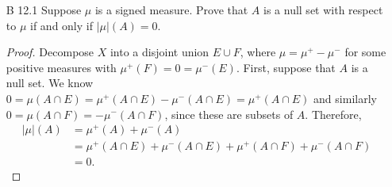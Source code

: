 \documentclass[10pt]{article}
\newcommand{\Q}{\mathbb{Q}}
\begin{document}
\begin{enumerate}
\begin{enumerate}
\begin{proof}
The forward inclusion is obvious, because $[0,\delta) \cap \Q \subset [0,\delta)$.  For the reverse inclusion, suppose that $x \in g_y^{-1}([0,\epsilon])$ for all $y \in [0,\delta) \cap \Q$.  For a given $y \in [0,\delta)$, take a sequence $y_n$ in $[0,\delta) \cap \Q$ converging to $y$.  By assumption, we have $g_{y_n}(x) \leq \epsilon$ for all $y_n$.  Since $g_y(x)$ is the absolute value of a difference of functions that are continuous in $y$, it is continuous in $y$ as well.  So taking limits gives $g_y(x) = \lim\limits_{n \rightarrow \infty} g_{y_n}(x) \leq \epsilon$, hence $x \in g_y^{-1}([0,\epsilon])$.  Because $y$ was arbitrary, the reverse inclusion is established.
\end{proof}

\item For any $\epsilon > 0$ there is a set $E \subset X$ such that $\mu(E) < \epsilon$ and $f(\cdot , y) \rightarrow f( \cdot , 0)$ uniformly on $E^c$ as $y \rightarrow 0$.

\begin{proof}
Since $f(x,y)$ is continuous in $y$ for all $x \in X$, we know $\lim\limits_{y \rightarrow 0} f(x,y) = f(x,0)$.  Any sequence $y_n \rightarrow 0$ gives a sequence $f_n(x) = f(x,y_n)$ which then converges to $f(x,0)$.  So by Egoroff's theorem, there is such a set $E$ for which $f_n \rightarrow f$ uniformly on $E^c$.  This holds for all sequences $y_n$ converging to $0$, thus $f(\cdot,y) \rightarrow f(\cdot,0)$ uniformly on $E^c$ as $y \rightarrow 0$.
\end{proof}
\end{enumerate}

\item[B 12.1] Suppose $\mu$ is a signed measure.  Prove that $A$ is a null set with respect to $\mu$ if and only if $|\mu|(A) = 0$.

\begin{proof}
Decompose $X$ into a disjoint union $E \cup F$, where $\mu = \mu^+ - \mu^-$ for some positive measures with $\mu^+(F) = 0 = \mu^-(E)$.  First, suppose that $A$ is a null set.  We know $0 = \mu(A \cap E) = \mu^+(A \cap E) - \mu^-(A \cap E) = \mu^+(A \cap E)$ and similarly $0 = \mu(A \cap F) = - \mu^- (A \cap F)$, since these are subsets of $A$.  Therefore,
\begin{align*}
|\mu|(A) &= \mu^+(A) + \mu^-(A) \\
&= \mu^+(A \cap E) + \mu^-(A \cap E) + \mu^+(A \cap F) + \mu^-(A \cap F) \\
&= 0.
\end{align*}


\end{proof}
\end{enumerate}
\end{document}
